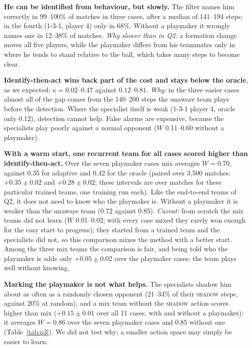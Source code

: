 \documentclass{article}
\begin{document}
\textbf{He can be identified from behaviour, but slowly.} The filter names him correctly in 99--100\% of matches in
three cases, after a median of 141--194 steps; in the fourth (1-3-1, player 4) only in 68\%. Without a playmaker it
wrongly names one in 12--38\% of matches. \emph{Why slower than in Q2:} a formation change moves all five players,
while the playmaker differs from his teammates only in where he tends to stand relative to the ball, which takes many
steps to become clear.

\textbf{Identify-then-act wins back part of the cost and stays below the oracle}, as we expected: $\kappa=0.02$--$0.47$
against $0.12$--$0.81$. \emph{Why:} in the three easier cases almost all of the gap comes from the 140--200 steps the
unaware team plays before the detection. Where the specialist itself is weak (1-3-1 player 4, oracle only 0.12),
detection cannot help. False alarms are expensive, because the specialists play poorly against a normal opponent
($W$ 0.11--0.60 without a playmaker).

\textbf{With a warm start, one recurrent team for all cases scored higher than identify-then-act.} Over the seven playmaker cases mix averages $W=0.70$, against 0.35
for adaptive and 0.42 for the oracle (paired over 3{,}500 matches: $+0.35\pm0.02$ and $+0.28\pm0.02$; these intervals
are over matches for these particular trained teams, one training run each). Like the end-to-end teams of Q2, it does not need to know who the playmaker is. Without a
playmaker it is weaker than the unaware team (0.72 against 0.85). \emph{Caveat:} from scratch the mix teams did not learn
($W$ 0.01--0.02; with every case mixed they rarely won enough for the easy start to progress); they started from a
trained team and the specialists did not, so this comparison mixes the method with a better start. Among the three mix teams the comparison is fair, and being told
who the playmaker is adds only $+0.05\pm0.02$ over the playmaker cases: the team plays well without knowing.

\textbf{Marking the playmaker is not what helps.} The specialists shadow him about as often as a randomly chosen
opponent (21--34\% of their \textsc{shadow} steps, against 20\% at random), and a mix team without the \textsc{shadow}
action scores higher than mix ($+0.15\pm0.01$ over all 11 cases, with and without a playmaker): it averages $W=0.86$ over
the seven playmaker cases and 0.85 without one (Table~\ref{tab:q3}). We did not test why; a smaller action space may simply be
easier to learn.
\end{document}
